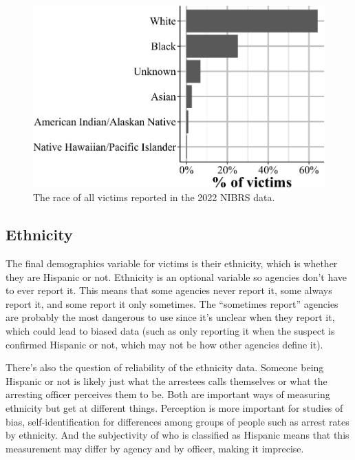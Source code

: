 \documentclass[
  12pt,
  openany]{book}
\begin{document}
\begin{figure}

{\centering \includegraphics[width=0.9\linewidth]{15_nibrs_victim_files/figure-latex/victimRace-1} 

}

\caption{The race of all victims reported in the 2022 NIBRS data.}\label{fig:victimRace}
\end{figure}

\subsection{Ethnicity}\label{ethnicity-2}

The final demographics variable for victims is their ethnicity, which is whether they are Hispanic or not. Ethnicity is an optional variable so agencies don't have to ever report it. This means that some agencies never report it, some always report it, and some report it only sometimes. The ``sometimes report'' agencies are probably the most dangerous to use since it's unclear when they report it, which could lead to biased data (such as only reporting it when the suspect is confirmed Hispanic or not, which may not be how other agencies define it).

There's also the question of reliability of the ethnicity data. Someone being Hispanic or not is likely just what the arrestees calls themselves or what the arresting officer perceives them to be. Both are important ways of measuring ethnicity but get at different things. Perception is more important for studies of bias, self-identification for differences among groups of people such as arrest rates by ethnicity. And the subjectivity of who is classified as Hispanic means that this measurement may differ by agency and by officer, making it imprecise.
\end{document}
